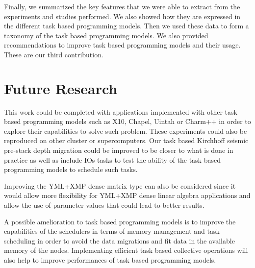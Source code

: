 Finally, we summarized the key features that we were able to extract from the experiments and studies performed.
We also showed how they are expressed in the different task based programming models.
Then we used these data to form a taxonomy of the task based programming models.
We also provided recommendations to improve task based programming models and their usage.
These are our third contribution.

\section{Future Research}

This work could be completed with applications implemented with other task based programming models such as X10, Chapel, Uintah or Charm++ in order to explore their capabilities to solve such problem.
These experiments could also be reproduced on other cluster or supercomputers.
Our task based Kirchhoff seismic pre-stack depth migration could be improved to be closer to what is done in practice as well as include IOs tasks to test the ability of the task based programming models to schedule such tasks.

Improving the YML+XMP dense matrix type can also be considered since it would allow more flexibility for YML+XMP dense linear algebra applications and allow the use of parameter values that could lead to better results.

A possible amelioration to task based programming models is to improve the capabilities of the schedulers in terms of memory management and task scheduling in order to avoid the data migrations and fit data in the available memory of the nodes.
Implementing efficient task based collective operations will also help to improve performances of task based programming models.
